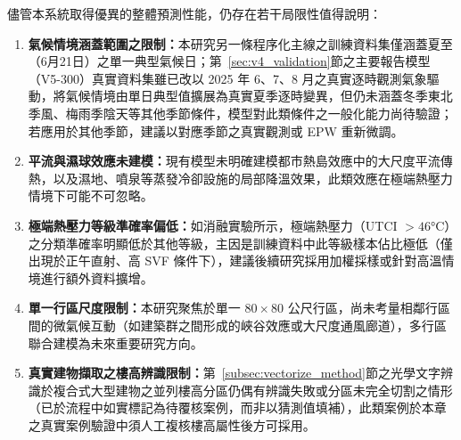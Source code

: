 儘管本系統取得優異的整體預測性能，仍存在若干局限性值得說明：

\begin{enumerate}
    \item \textbf{氣候情境涵蓋範圍之限制：}本研究另一條程序化主線之訓練資料集僅涵蓋夏至（6月21日）之單一典型氣候日；第~\ref{sec:v4_validation}節之主要報告模型（V5-300）真實資料集雖已改以 2025 年 6、7、8 月之真實逐時觀測氣象驅動，將氣候情境由單日典型值擴展為真實夏季逐時變異，但仍未涵蓋冬季東北季風、梅雨季陰天等其他季節條件，模型對此類條件之一般化能力尚待驗證；若應用於其他季節，建議以對應季節之真實觀測或 EPW 重新微調。
    \item \textbf{平流與濕球效應未建模：}現有模型未明確建模都市熱島效應中的大尺度平流傳熱，以及濕地、噴泉等蒸發冷卻設施的局部降溫效果，此類效應在極端熱壓力情境下可能不可忽略。
    \item \textbf{極端熱壓力等級準確率偏低：}如消融實驗所示，極端熱壓力（UTCI $> 46°\text{C}$）之分類準確率明顯低於其他等級，主因是訓練資料中此等級樣本佔比極低（僅出現於正午直射、高 SVF 條件下），建議後續研究採用加權採樣或針對高溫情境進行額外資料擴增。
    \item \textbf{單一行區尺度限制：}本研究聚焦於單一 $80 \times 80$ 公尺行區，尚未考量相鄰行區間的微氣候互動（如建築群之間形成的峽谷效應或大尺度通風廊道），多行區聯合建模為未來重要研究方向。
    \item \textbf{真實建物擷取之樓高辨識限制：}第~\ref{subsec:vectorize_method}節之光學文字辨識於複合式大型建物之並列樓高分區仍偶有辨識失敗或分區未完全切割之情形（已於流程中如實標記為待覆核案例，而非以猜測值填補），此類案例於本章之真實案例驗證中須人工複核樓高屬性後方可採用。
\end{enumerate}
